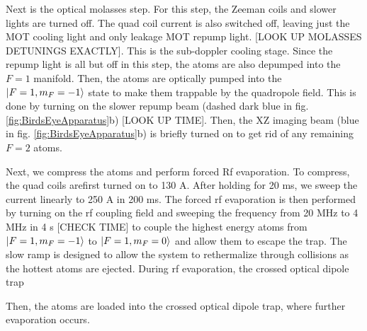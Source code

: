Next is the optical molasses step. For this step, the Zeeman coils and slower lights are turned off. The quad coil current is also switched off, leaving just the MOT cooling light and only leakage MOT repump light. [LOOK UP MOLASSES DETUNINGS EXACTLY]. This is the sub-doppler cooling stage. Since the repump light is all but off in this step, the atoms are also depumped into the $F=1$ manifold. Then, the atoms are optically pumped into the $\mathinner{|{F=1,m_F=-1}\rangle}$ state to make them trappable by the quadropole field. This is done by turning on the slower repump beam (dashed dark blue in fig. \ref{fig:BirdsEyeApparatus}b) [LOOK UP TIME]. Then, the XZ imaging beam (blue in fig. \ref{fig:BirdsEyeApparatus}b) is briefly turned on to get rid of any remaining $F=2$ atoms. 

Next, we compress the atoms and perform forced Rf evaporation. To compress, the quad coils arefirst turned on to 130 A. After holding for 20 ms, we sweep the current linearly to 250 A in 200 ms. The forced rf evaporation is then performed by turning on the rf coupling field and sweeping the frequency from 20 MHz to 4 MHz in 4 s [CHECK TIME] to couple the highest energy atoms from $\mathinner{|{F=1,m_F=-1}\rangle}$ to $\mathinner{|{F=1,m_F=0}\rangle}$ and allow them to escape the trap. The slow ramp is designed to allow the system to rethermalize through collisions as the hottest atoms are ejected. During rf evaporation, the crossed optical dipole trap

Then, the atoms are loaded into the crossed optical dipole trap, where further evaporation occurs.

